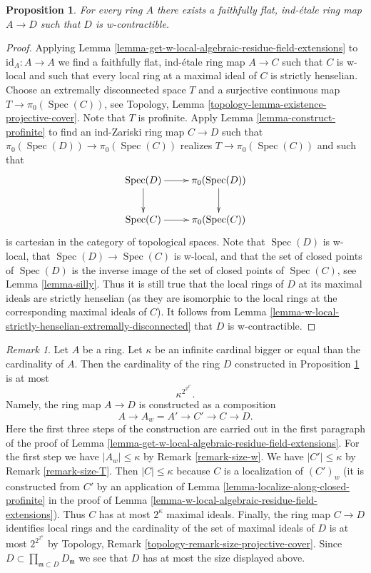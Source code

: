 \documentclass{stacks-project}
\theoremstyle{plain}
\newtheorem{proposition}[subsection]{Proposition}
\theoremstyle{definition}
\theoremstyle{remark}
\newtheorem{remark}[subsection]{Remark}
\numberwithin{equation}{subsection}
\def\Spec{\mathop{\mathrm{Spec}}}
\begin{document}
\begin{proposition}
\label{proposition-find-w-contractible}
For every ring $A$ there exists a faithfully flat, ind-\'etale ring
map $A \to D$ such that $D$ is w-contractible.
\end{proposition}

\begin{proof}
Applying Lemma \ref{lemma-get-w-local-algebraic-residue-field-extensions}
to $\text{id}_A : A \to A$ we find a faithfully flat, ind-\'etale ring map
$A \to C$ such that $C$ is w-local and such that every local ring at a
maximal ideal of $C$ is strictly henselian.
Choose an extremally disconnected space $T$ and a surjective
continuous map $T \to \pi_0(\Spec(C))$, see
Topology, Lemma \ref{topology-lemma-existence-projective-cover}.
Note that $T$ is profinite. Apply Lemma \ref{lemma-construct-profinite}
to find an ind-Zariski ring map $C \to D$ such that
$\pi_0(\Spec(D)) \to \pi_0(\Spec(C))$ realizes $T \to \pi_0(\Spec(C))$
and such that
$$
\xymatrix{
\Spec(D) \ar[r] \ar[d] & \pi_0(\Spec(D)) \ar[d] \\
\Spec(C) \ar[r] & \pi_0(\Spec(C))
}
$$
is cartesian in the category of topological spaces. Note that $\Spec(D)$
is w-local, that $\Spec(D) \to \Spec(C)$ is w-local, and that the
set of closed points of $\Spec(D)$ is the inverse image of the
set of closed points of $\Spec(C)$, see Lemma \ref{lemma-silly}.
Thus it is still true that the local rings of $D$ at its maximal
ideals are strictly henselian (as they are isomorphic to the
local rings at the corresponding maximal ideals of $C$).
It follows from
Lemma \ref{lemma-w-local-strictly-henselian-extremally-disconnected}
that $D$ is w-contractible.
\end{proof}

\begin{remark}
\label{remark-size-w-contractible}
Let $A$ be a ring. Let $\kappa$ be an infinite cardinal bigger or
equal than the cardinality of $A$. Then the cardinality of the
ring $D$ constructed in Proposition \ref{proposition-find-w-contractible}
is at most
$$
\kappa^{2^{2^{2^\kappa}}}.
$$
Namely, the ring map $A \to D$ is
constructed as a composition
$$
A \to A_w = A' \to C' \to C \to D.
$$
Here the first three steps of the construction are carried out
in the first paragraph of the proof of
Lemma \ref{lemma-get-w-local-algebraic-residue-field-extensions}.
For the first step we have $|A_w| \leq \kappa$ by
Remark \ref{remark-size-w}.
We have $|C'| \leq \kappa$ by
Remark \ref{remark-size-T}.
Then $|C| \leq \kappa$ because $C$ is a localization of $(C')_w$
(it is constructed from $C'$ by an application of
Lemma \ref{lemma-localize-along-closed-profinite}
in the proof of Lemma \ref{lemma-w-local-algebraic-residue-field-extensions}).
Thus $C$ has at most $2^\kappa$ maximal ideals.
Finally, the ring map $C \to D$ identifies local rings and the
cardinality of the set of maximal ideals of $D$ is at most
$2^{2^{2^\kappa}}$ by
Topology, Remark \ref{topology-remark-size-projective-cover}.
Since $D \subset \prod_{\mathfrak m \subset D} D_\mathfrak m$ we see
that $D$ has at most the size displayed above.
\end{remark}
\end{document}
